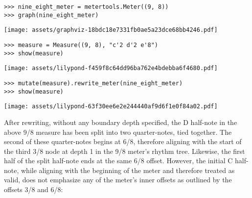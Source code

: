 \begin{abjadbookoutput}
\begin{singlespacing}
\vspace{-0.5\baselineskip}
\begin{verbatim}
>>> nine_eight_meter = metertools.Meter((9, 8))
>>> graph(nine_eight_meter)
\end{verbatim}
\noindent\texttt{[image: assets/graphviz-18bdc18e7331fb0ae5a23dce68bb4246.pdf]}
\end{singlespacing}
\end{abjadbookoutput}

\begin{comment}
<abjad>
measure = Measure((9, 8), "c'2 d'2 e'8")
show(measure)
</abjad>
\end{comment}

\begin{abjadbookoutput}
\begin{singlespacing}
\vspace{-0.5\baselineskip}
\begin{verbatim}
>>> measure = Measure((9, 8), "c'2 d'2 e'8")
>>> show(measure)
\end{verbatim}
\noindent\texttt{[image: assets/lilypond-f459f8c64dd96ba762e4bdebba6f4680.pdf]}
\end{singlespacing}
\end{abjadbookoutput}

\begin{comment}
<abjad>
mutate(measure).rewrite_meter(nine_eight_meter)
show(measure)
</abjad>
\end{comment}

\begin{abjadbookoutput}
\begin{singlespacing}
\vspace{-0.5\baselineskip}
\begin{verbatim}
>>> mutate(measure).rewrite_meter(nine_eight_meter)
>>> show(measure)
\end{verbatim}
\noindent\texttt{[image: assets/lilypond-63f30ee6e2e244440af9d6f1e0f84a02.pdf]}
\end{singlespacing}
\end{abjadbookoutput}

\noindent After rewriting, without any boundary depth specified, the D
half-note in the above 9/8 measure has been split into two quarter-notes, tied
together. The second of these quarter-notes begins at 6/8, therefore aligning
with the start of the third 3/8 node at depth 1 in the 9/8 meter's rhythm tree.
Likewise, the first half of the split half-note ends at the same 6/8 offset.
However, the initial C half-note, while aligning with the beginning of the
meter and therefore treated as valid, does not emphasize any of the meter's
inner offsets as outlined by the offsets 3/8 and 6/8:

